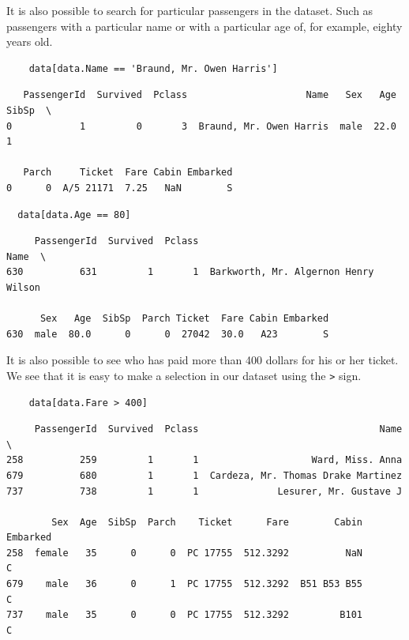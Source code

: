 \documentclass[11pt]{article}
\begin{document}
It is also possible to search for particular passengers in the dataset. Such as passengers with a particular name or with a particular age of, for example, eighty years old. 

\begin{verbatim}
    data[data.Name == 'Braund, Mr. Owen Harris']
\end{verbatim}

\begin{verbatim}
   PassengerId  Survived  Pclass                     Name   Sex   Age  SibSp  \
0            1         0       3  Braund, Mr. Owen Harris  male  22.0      1   

   Parch     Ticket  Fare Cabin Embarked  
0      0  A/5 21171  7.25   NaN        S  
\end{verbatim}

\begin{verbatim}
  data[data.Age == 80]
\end{verbatim}

\begin{verbatim}
     PassengerId  Survived  Pclass                                  Name  \
630          631         1       1  Barkworth, Mr. Algernon Henry Wilson   

      Sex   Age  SibSp  Parch Ticket  Fare Cabin Embarked  
630  male  80.0      0      0  27042  30.0   A23        S  
\end{verbatim}

It is also possible to see who has paid more than 400 dollars for his or her ticket. We see that it is easy to make a selection in our dataset using the \texttt{>} sign.

\begin{verbatim}
    data[data.Fare > 400]
\end{verbatim}

\begin{verbatim}
     PassengerId  Survived  Pclass                                Name  \
258          259         1       1                    Ward, Miss. Anna   
679          680         1       1  Cardeza, Mr. Thomas Drake Martinez   
737          738         1       1              Lesurer, Mr. Gustave J   

        Sex  Age  SibSp  Parch    Ticket      Fare        Cabin Embarked  
258  female   35      0      0  PC 17755  512.3292          NaN        C  
679    male   36      0      1  PC 17755  512.3292  B51 B53 B55        C  
737    male   35      0      0  PC 17755  512.3292         B101        C  
\end{verbatim}
\end{document}
